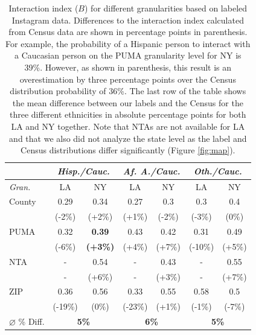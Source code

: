 \begin{table}[t]
\centering
{\small
\begin{tabular}{| l | c | c | c | c | c | c |}
\hline
 & \multicolumn{2}{c|}{\textit{Hisp./Cauc.}} & \multicolumn{2}{c|}{\textit{Af. A./Cauc.}} & \multicolumn{2}{c|}{\textit{Oth./Cauc.}} \\ \hline
\textit{Gran.} & LA       & NY       & LA       & NY       & LA       & NY       \\ \hline
County         & 0.29     & 0.34     & 0.27     & 0.3     & 0.3        &  0.4    \\
               & (-2\%)   & (+2\%)   & (+1\%)   & (-2\%)   & (-3\%)    & (0\%) \\ \hline 
PUMA           & 0.32     & \textbf{0.39}     & 0.43     & 0.42     & 0.31     &  0.49    \\
               & (-6\%)   & \textbf{(+3\%)}   & (+4\%)    & (+7\%)   & (-10\%)  & (+5\%) \\ \hline 
NTA            & -        & 0.54     & -        & 0.43     & -        & 0.55     \\
               & -        & (+6\%)   & -        & (+3\%)  & -        & (+7\%) \\ \hline 
ZIP            & 0.36     & 0.56     & 0.33     & 0.55     & 0.58     &  0.5    \\
               & (-19\%)  & (0\%)   & (-23\%)   & (+1\%)   & (-1\%)   & (-7\%) \\ \hline
$\varnothing$ \% Diff.       & \multicolumn{2}{c|}{\textbf{5\%}} & \multicolumn{2}{c|}{\textbf{6\%}} & \multicolumn{2}{c|}{\textbf{5\%}} \\ \hline
\end{tabular}}
\caption{Interaction index ($B$) for different granularities based on labeled Instagram data. Differences to the interaction index calculated from Census data are shown in percentage points in parenthesis. For example, the probability of a Hispanic person to interact with a Caucasian person on the PUMA granularity level for NY is 39\%. However, as shown in parenthesis, this result is an overestimation by three percentage points over the Census distribution probability of 36\%. The last row of the table shows the mean difference between our labels and the Census for the three different ethnicities in absolute percentage points for both LA and NY together. Note that NTAs are not available for LA and that we also did not analyze the state level as the label and Census distributions differ significantly (Figure \ref{fig:map}).}
\vspace{2mm}
\label{tab:interaction}
\end{table}



